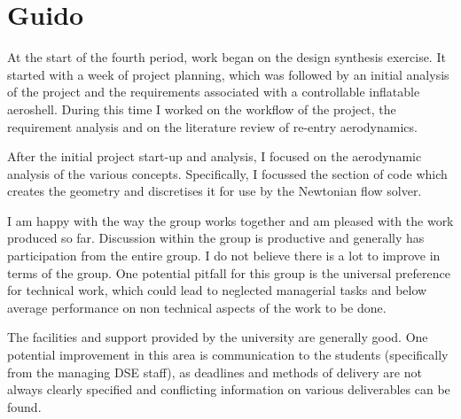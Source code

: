 \section{Guido}
At the start of the fourth period, work began on the design synthesis exercise.  It started with a week of project planning, which was followed by an initial analysis of the project and the requirements associated with a controllable inflatable aeroshell.  During this time I worked on the workflow of the project, the requirement analysis and on the literature review of re-entry aerodynamics.  

After the initial project start-up and analysis, I focused on the aerodynamic analysis of the various concepts. Specifically, I focussed the section of code which creates the geometry and discretises it for use by the Newtonian flow solver. 

I am happy with the way the group works together and am pleased with the work produced so far. Discussion within the group is productive and generally has participation from the entire group.  I do not believe there is a lot to improve in terms of the group. One potential pitfall for this group is the universal preference for technical work, which could lead to neglected managerial tasks and below average performance on non technical aspects of the work to be done. 

The facilities and support provided by the university are generally good. One potential improvement in this area is communication to the students (specifically from the managing DSE staff), as deadlines and methods of delivery are not always clearly specified and conflicting information on various deliverables can be found.  

   